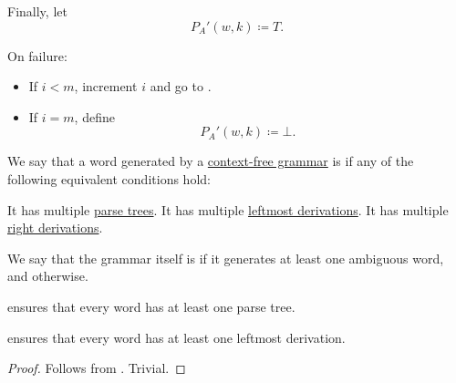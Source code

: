\begin{algorithm}
\begin{thmenum}
    Finally, let
    \begin{equation*}
      P_A'(w, k) \coloneqq T.
    \end{equation*}

     On failure:
    \hfill
    \begin{itemize}
      \item If \( i < m \), increment \( i \) and go to .
      \item If \( i = m \), define
      \begin{equation*}
        P_A'(w, k) \coloneqq \bot.
      \end{equation*}
    \end{itemize}
  \end{thmenum}
\end{algorithm}

\begin{definition}\label{def:grammar_ambiguity}
  We say that a word generated by a \hyperref[def:chomsky_hierarchy/context_free]{context-free grammar} is  if any of the following equivalent conditions hold:
  \begin{thmenum}
     It has multiple \hyperref[def:parse_tree]{parse trees}.
     It has multiple \hyperref[def:leftmost_derivation]{leftmost derivations}.
     It has multiple \hyperref[def:leftmost_derivation]{right derivations}.
  \end{thmenum}

  We say that the grammar itself is  if it generates at least one ambiguous word, and  otherwise.
\end{definition}
\begin{comments}
  \item {} ensures that every word has at least one parse tree.
  \item {} ensures that every word has at least one leftmost derivation.
\end{comments}
\begin{proof}
   Follows from .
   Trivial.
\end{proof}

